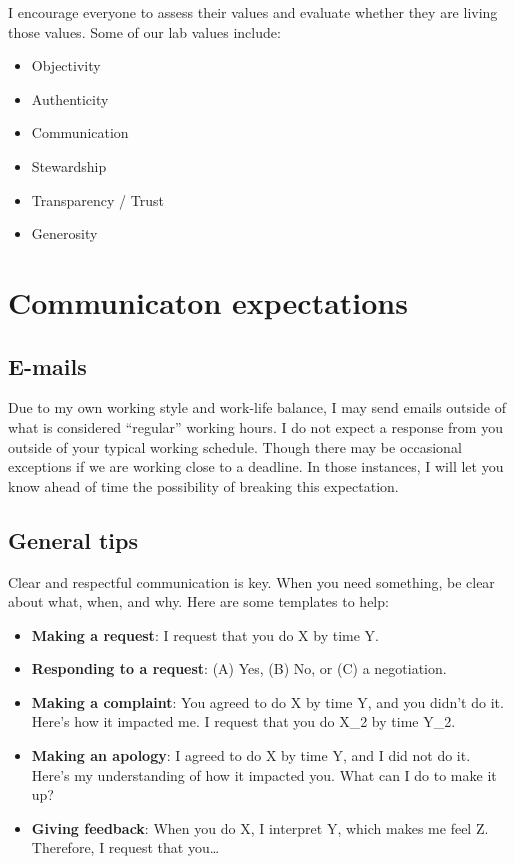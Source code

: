 \documentclass[
  letterpaper,
  DIV=11,
  numbers=noendperiod]{scrreprt}
\providecommand{\tightlist}{%
  \setlength{\itemsep}{0pt}\setlength{\parskip}{0pt}}\usepackage{longtable,booktabs,array}
\begin{document}
I encourage everyone to assess their values and evaluate whether they
are living those values. Some of our lab values include:

\begin{itemize}
\tightlist
\item
  Objectivity
\item
  Authenticity
\item
  Communication
\item
  Stewardship
\item
  Transparency / Trust
\item
  Generosity
\end{itemize}

\section*{Communicaton expectations}\label{communicaton-expectations}


\subsection*{E-mails}\label{e-mails}

Due to my own working style and work-life balance, I may send emails
outside of what is considered ``regular'' working hours. I do not expect
a response from you outside of your typical working schedule. Though
there may be occasional exceptions if we are working close to a
deadline. In those instances, I will let you know ahead of time the
possibility of breaking this expectation.

\subsection*{General tips}\label{general-tips}

Clear and respectful communication is key. When you need something, be
clear about what, when, and why. Here are some templates to help:

\begin{itemize}
\tightlist
\item
  \textbf{Making a request}: I request that you do X by time Y.
\item
  \textbf{Responding to a request}: (A) Yes, (B) No, or (C) a
  negotiation.
\item
  \textbf{Making a complaint}: You agreed to do X by time Y, and you
  didn't do it. Here's how it impacted me. I request that you do X\_2 by
  time Y\_2.
\item
  \textbf{Making an apology}: I agreed to do X by time Y, and I did not
  do it. Here's my understanding of how it impacted you. What can I do
  to make it up?
\item
  \textbf{Giving feedback}: When you do X, I interpret Y, which makes me
  feel Z. Therefore, I request that you\ldots{}
\end{itemize}
\end{document}
